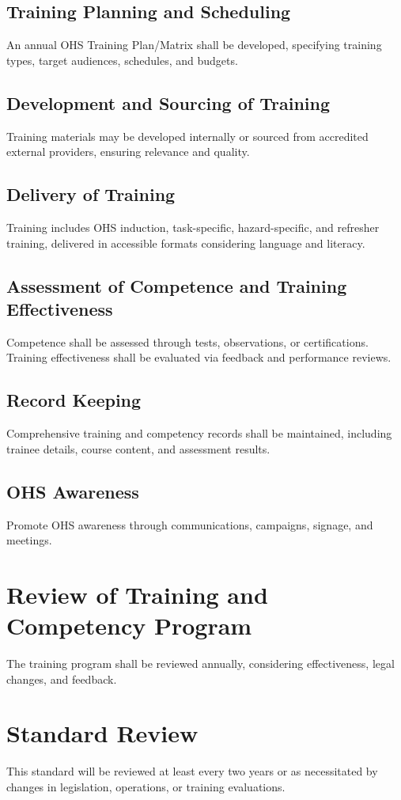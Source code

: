 \documentclass[12pt]{article}
\begin{document}
\subsection{Training Planning and Scheduling}
An annual OHS Training Plan/Matrix shall be developed, specifying training types, target audiences, schedules, and budgets.

\subsection{Development and Sourcing of Training}
Training materials may be developed internally or sourced from accredited external providers, ensuring relevance and quality.

\subsection{Delivery of Training}
Training includes OHS induction, task-specific, hazard-specific, and refresher training, delivered in accessible formats considering language and literacy.

\subsection{Assessment of Competence and Training Effectiveness}
Competence shall be assessed through tests, observations, or certifications. Training effectiveness shall be evaluated via feedback and performance reviews.

\subsection{Record Keeping}
Comprehensive training and competency records shall be maintained, including trainee details, course content, and assessment results.

\subsection{OHS Awareness}
Promote OHS awareness through communications, campaigns, signage, and meetings.

\section{Review of Training and Competency Program}
The training program shall be reviewed annually, considering effectiveness, legal changes, and feedback.

\section{Standard Review}
This standard will be reviewed at least every two years or as necessitated by changes in legislation, operations, or training evaluations.
\end{document}
